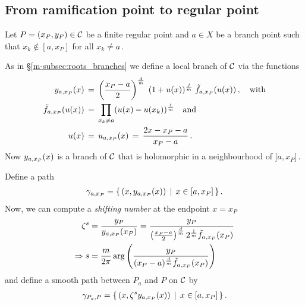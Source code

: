 \documentclass[main.tex]{subfiles}
\begin{document}
  
  \subsection{From ramification point to regular point}\label{subsec:ajm_finite}
  
   Let $P = (x_P,y_P) \in \mathcal{C}$ be a finite regular point and $a \in X$ be a branch point such that $x_k \not\in [a,x_P]$ for all $x_k \ne a$\,.
  
  As in \S \ref{m-subsec:roots_branches} we define a local branch of $\mathcal{C}$ via the functions
  \begin{align}\label{def:yax}
  \begin{split}
   y_{a,x_P}(x) \, & = \, \left(\frac{x_P-a}{2}\right)^{\frac{d}{m}} \; (1 + u(x))^{\frac{j}{m}} \; \tilde{f}_{a,x_P}(u(x))\,, \quad \text{with} \\
   \tilde{f}_{a,x_P}(u(x)) \, & = \, \prod_{x_k \ne a} (u(x) - u(x_k))^{\frac{1}{m}} \quad \text{and} \\
   u(x) \,& = \, u_{a,x_P}(x) \,=\, \frac{2x-x_P-a}{x_P-a}\,.
   \end{split}
  \end{align}
  Now $y_{a,x_P}(x)$ is a branch of $\mathcal{C}$ that is holomorphic in a neighbourhood of $]a,x_P]$\,.
  
  Define a path
  \begin{align*}
   \gamma_{a,x_P} = \{ \, (x,y_{a,x_P}(x)) \, \mid \, x \in [a,x_P] \, \}\,.
  \end{align*}
  Now, we can compute a \emph{shifting number} at the endpoint $x=x_P$
  \begin{align*}
   \zeta^s & = \frac{y_P}{y_{a,x_P}(x_P)} = \frac{y_P}{\left(\frac{x_P-a}{2}\right)^{\frac{d}{m}} 2^{\frac{1}{m}} \tilde{f}_{a,x_P}(x_P)} \\
   \Rightarrow s & = \frac{m}{2\pi} \arg\left(  \frac{y_P}{ (x_P-a)^{\frac{d}{m}} \tilde{f}_{a,x_P}(x_P)} \right)
  \end{align*}
  and define a smooth path between $P_a$ and $P$ on $\mathcal{C}$ by
  \begin{align*}
   \gamma_{P_a,P} = \{ \, (x, \zeta^s y_{a,x_P}(x)) \, \mid \, x \in [a,x_P] \, \}\,.
  \end{align*}
\end{document}
